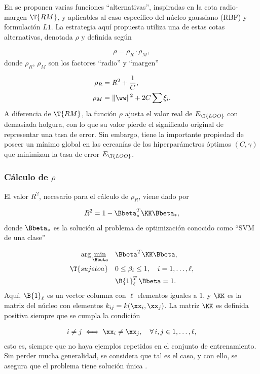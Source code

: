 En \cite{chung} se proponen varias funciones ``alternativas'',
inspiradas en la cota radio-margen $\T{RM}$, y aplicables al caso
específico del núcleo gaussiano (RBF) y formulación $L1$. La
estrategia aquí propuesta utiliza una de estas cotas
alternativas, denotada $\rho$ y definida según

\begin{align}
  \rho = \rho_R \cdot \rho_M,
\end{align}
donde $\rho_R$, $\rho_M$ son los factores ``radio'' y ``margen''

\begin{align}
  \rho_R &= R^2+\frac{1}{C}, \\
  \rho_M &= \|\ww\|^2+2C\sum\xi_i.
\end{align}
A diferencia de $\T{RM}$, la función $\rho$ ajusta el valor
real de $E_{\T{LOO}}$ con demasiada holgura, con lo que su valor
pierde el significado original de representar una tasa de error. Sin
embargo, tiene la importante propiedad de poseer un mínimo global en
las cercanías de los hiperparámetros óptimos $(C,\gamma)$ que
minimizan la tasa de error $E_{\T{LOO}}$.

\subsubsection{Cálculo de $\rho$}
El valor $R^2$, necesario para el cálculo de $\rho_R$, viene dado por

\begin{align}
  R^2 = 1 - \Bbeta_*^T \KK \Bbeta_*,
\end{align}
donde $\Bbeta_*$ es la solución al problema de optimización conocido
como ``SVM de una clase'' \cite{scholkopf}

\begin{align}
\begin{split}
  \arg\min_{\Bbeta}\quad&\Bbeta^T \KK \Bbeta,\\
  \T{sujeto a}    \quad&0\leq\beta_i\leq{}1,\quad{}i=1,\ldots,\ell,\\
                       &\B{1}^T_\ell\,\Bbeta=1.
  \end{split}
  \label{svm-oneclass}
\end{align}
Aquí, $\B{1}_{\ell}$ es un vector columna con $\ell$ elementos iguales
a 1, y $\KK$ es la matriz del núcleo con elementos
$k_{ij}=k(\xx_i,\xx_j)$. La matriz $\KK$ es definida positiva siempre
que se cumpla la condición

\begin{align}
\label{cond-kmatrix-defpos}
  i\neq j \iff \xx_i\neq\xx_j,\quad \forall\,i,j\in{1,\ldots,\ell},
\end{align}
esto es, siempre que no haya ejemplos repetidos en el conjunto de
entrenamiento. Sin perder mucha generalidad, se considera que tal es
el caso, y con ello, se asegura que el problema \cite{svm-oneclass}
tiene solución única \cite{SOL-UNICA-DEFINIDA-POSITIVA}.

